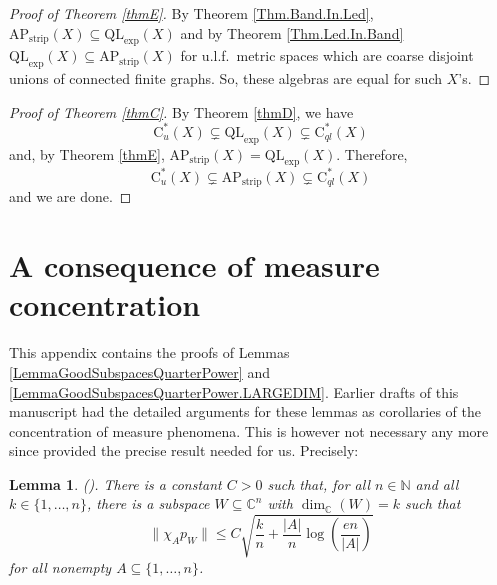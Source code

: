 \documentclass[11pt]{amsart}
\newcommand{\N}{\mathbb{N}}
\newcommand{\C}{\mathbb{C}}
\newcommand{\cstu}{\mathrm{C}^*_u}
\newcommand{\cstql}{\mathrm{C}^*_{\textit{ql}}}
\numberwithin{equation}{section}
\newtheorem{lemma}[theorem]{Lemma}
\theoremstyle{definition}
\theoremstyle{remark}
\begin{document}
\begin{proof}
    [Proof of Theorem \ref{thmE}]
By Theorem  \ref{Thm.Band.In.Led}, $\mathrm{AP}_{\mathrm{strip}}(X)\subseteq \mathrm{QL}_{\exp}(X)$ and by Theorem \ref{Thm.Led.In.Band} $\mathrm{QL}_{\exp}(X)\subseteq \mathrm{AP}_{\mathrm{strip}}(X)$ for u.l.f.\ metric spaces which are coarse disjoint unions of connected  finite graphs. So, these algebras are equal for such $X$'s.
\end{proof}
 
\begin{proof}[Proof of Theorem \ref{thmC}]
    By Theorem \ref{thmD}, we have 
    \[\cstu(X)\subsetneq \mathrm{QL}_{\exp}(X)\subsetneq \cstql(X)\]
    and, by Theorem \ref{thmE}, $\mathrm{AP}_{\mathrm{strip}}(X)=\mathrm{QL}_{\exp}(X)$. Therefore,
    \[\cstu(X)\subsetneq \mathrm{AP}_{\mathrm{strip}}(X)\subsetneq \cstql(X)\]
    and we are done.
\end{proof}

\appendix

\section{A consequence of measure concentration} \label{Appendix}
This appendix contains the proofs of Lemmas  \ref{LemmaGoodSubspacesQuarterPower} and \ref{LemmaGoodSubspacesQuarterPower.LARGEDIM}. Earlier drafts of this manuscript had the detailed arguments for these lemmas as corollaries of the concentration of measure phenomena. This is however not necessary any more since \cite{LiZhangZhu2026} provided the precise result needed for us. Precisely: 



\begin{lemma}\emph{(}\cite[Proposition 6.3]{LiZhangZhu2026}\emph{)}. There is a constant $C>0$ such that, for all $n\in\N$ and all $k\in\{1,\dots,n\}$,    there is a subspace $W\subseteq\C^n$ with $\dim_{\C}(W)=k$ such that
\begin{equation}\label{eq:framebound.complex}
\|\chi_Ap_W\|\leq C\sqrt{\frac kn+\frac{|A|}{n}\log\left(\frac{en}{|A|}\right)}
\end{equation}
for all nonempty $A\subseteq\{1,\dots,n\}$.\label{cor.lem:frame}
\end{lemma}


 
\end{document}

